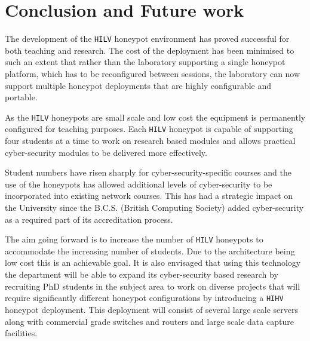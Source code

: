 \section{Conclusion and Future work}\label{Future}
The development of the \texttt{HILV} honeypot environment has proved successful for both teaching and research. The cost of the deployment has been minimised to such an extent that rather than the laboratory supporting a single honeypot platform, which has to be reconfigured between sessions, the laboratory can now support multiple honeypot deployments that are highly configurable and portable. 

As the \texttt{HILV} honeypots are small scale and low cost the equipment is permanently configured for teaching purposes. Each \texttt{HILV} honeypot is capable of supporting four students at a time to work on research based modules and allows practical cyber-security modules to be delivered more effectively.

Student numbers have risen sharply for cyber-security-specific courses and the use of the honeypots has allowed additional levels of cyber-security to be incorporated into existing network courses. This has had a strategic impact on the University since the B.C.S. (British Computing Society) added cyber-security as a required part of its accreditation process. 

The aim going forward is to increase the number of \texttt{HILV} honeypots to accommodate the increasing number of students. Due to the architecture being low cost this is an achievable goal. It is also envisaged that using this technology the department will be able to expand its cyber-security based research by recruiting PhD students in the subject area to work on diverse projects that will require significantly different honeypot configurations by introducing a \texttt{HIHV} honeypot deployment. This deployment will consist of several large scale servers along with commercial grade switches and routers and large scale data capture facilities.  


